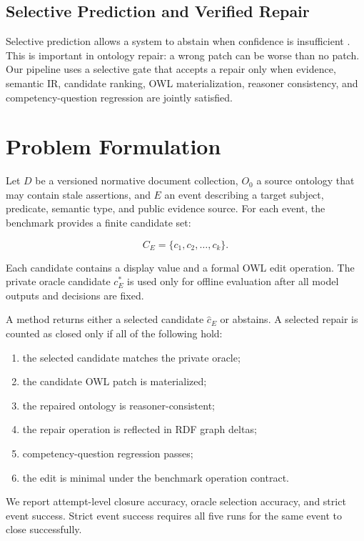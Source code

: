 \documentclass[11pt]{article}
\begin{document}
\subsection{Selective Prediction and Verified Repair}

Selective prediction allows a system to abstain when confidence is insufficient \citep{geifman2017selective}. This is important in ontology repair: a wrong patch can be worse than no patch. Our pipeline uses a selective gate that accepts a repair only when evidence, semantic IR, candidate ranking, OWL materialization, reasoner consistency, and competency-question regression are jointly satisfied.

\section{Problem Formulation}

Let $D$ be a versioned normative document collection, $O_0$ a source ontology that may contain stale assertions, and $E$ an event describing a target subject, predicate, semantic type, and public evidence source. For each event, the benchmark provides a finite candidate set:

\[
C_E = \{c_1, c_2, \ldots, c_k\}.
\]

Each candidate contains a display value and a formal OWL edit operation. The private oracle candidate $c^*_E$ is used only for offline evaluation after all model outputs and decisions are fixed.

A method returns either a selected candidate $\hat{c}_E$ or abstains. A selected repair is counted as closed only if all of the following hold:

\begin{enumerate}
    \item the selected candidate matches the private oracle;
    \item the candidate OWL patch is materialized;
    \item the repaired ontology is reasoner-consistent;
    \item the repair operation is reflected in RDF graph deltas;
    \item competency-question regression passes;
    \item the edit is minimal under the benchmark operation contract.
\end{enumerate}

We report attempt-level closure accuracy, oracle selection accuracy, and strict event success. Strict event success requires all five runs for the same event to close successfully.
\end{document}
